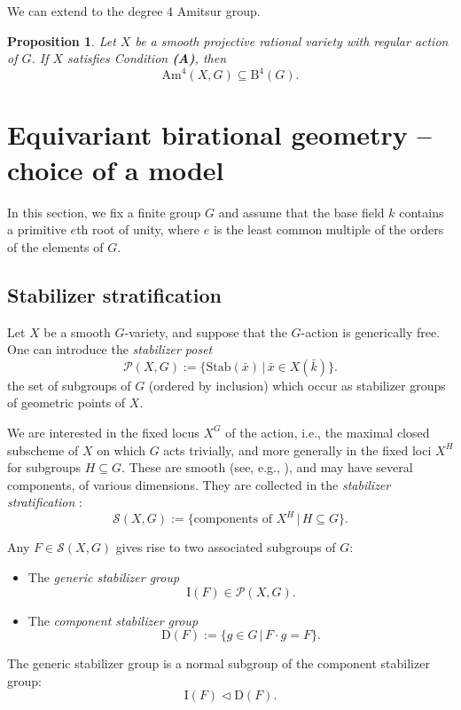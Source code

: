 \documentclass[12pt,reqno]{amsart}
\theoremstyle{plain}
\newtheorem{prop}{Proposition}[section]
\theoremstyle{remark}
\theoremstyle{definition}
\numberwithin{equation}{section}
\newcommand{\rB}{{\mathrm B}}
\begin{document}
We can extend \cite[Prop.\ 2]{TZ-uni} to the degree $4$ Amitsur group.

\begin{prop}
\label{prop.Am4Bogo}
Let $X$ be a smooth projective rational variety with regular action of $G$.
If $X$ satisfies Condition \emph{\textbf{(A)}}, then
\[
\mathrm{Am}^4(X,G)\subseteq \rB^4(G).
\]
\end{prop}


\section{Equivariant birational geometry -- choice of a model}
\label{sect:model}
In this section, we fix a finite group $G$ and assume that the base field $k$ contains a primitive $e$th root of unity, where $e$ is the least common multiple of the orders of the elements of $G$.

\subsection{Stabilizer stratification}
\label{sect:stab}
Let $X$ be a smooth $G$-variety, and suppose that the $G$-action is generically free.
One can 
introduce the \emph{stabilizer poset} 
\[
\mathcal{P}(X,G):=
\{ \mathrm{Stab}(\bar x)\,|\,\bar x\in X(\bar k) \}. 
\]
the set of subgroups of $G$ (ordered by inclusion) which occur as stabilizer groups of geometric points of $X$.

We are interested in the fixed locus $X^G$ of the action, i.e., the maximal closed subscheme of $X$ on which $G$ acts trivially, and more generally in the fixed loci $X^H$ for subgroups $H\subseteq G$.
These are smooth (see, e.g., \cite[Prop.\ A.8.10]{conradgabberprasad}), and may have several components, of various dimensions.
They are collected in the \emph{stabilizer stratification} \cite{BG}:
\[
\mathcal{S}(X,G):=\{\text{components of $X^H$}\,|\,H\subseteq G\}.
\]

Any $F\in \mathcal{S}(X,G)$ gives rise to two associated subgroups of $G$:
\begin{itemize}
\item The \emph{generic stabilizer group} \[ \mathrm{I}(F)\in \mathcal{P}(X,G). \]
\item The \emph{component stabilizer group}
\[ \mathrm{D}(F):=\{g\in G\,|\,F\cdot g=F\}. \]
\end{itemize}
The generic stabilizer group is a normal subgroup of the component stabilizer group:
\[ \mathrm{I}(F)\vartriangleleft \mathrm{D}(F). \]
\end{document}
